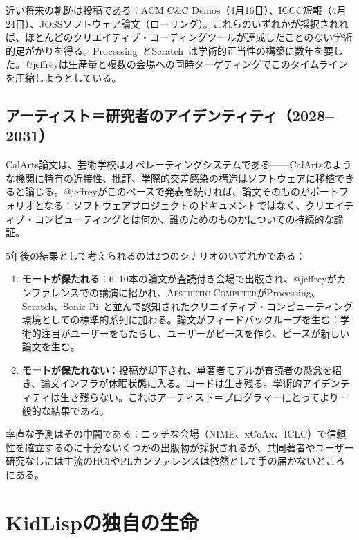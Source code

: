\documentclass[10pt,letterpaper,twocolumn]{article}
\newcommand{\ac}{\textsc{Aesthetic Computer}}
\begin{document}
近い将来の軌跡は投稿である：ACM C\&C Demos（4月16日）、ICCC短報（4月24日）、JOSSソフトウェア論文（ローリング）。これらのいずれかが採択されれば、ほとんどのクリエイティブ・コーディングツールが達成したことのない学術的足がかりを得る。Processing~\citep{reas2007processing}とScratch~\citep{resnick2009scratch}は学術的正当性の構築に数年を要した。@jeffreyは生産量と複数の会場への同時ターゲティングでこのタイムラインを圧縮しようとしている。

\subsection{アーティスト＝研究者のアイデンティティ（2028--2031）}

CalArts論文は、芸術学校はオペレーティングシステムである——CalArtsのような機関に特有の近接性、批評、学際的交差感染の構造はソフトウェアに移植できると論じる。@jeffreyがこのペースで発表を続ければ、論文そのものがポートフォリオとなる：ソフトウェアプロジェクトのドキュメントではなく、クリエイティブ・コンピューティングとは何か、誰のためのものかについての持続的な論証。

5年後の結果として考えられるのは2つのシナリオのいずれかである：

\begin{enumerate}
  \item \textbf{モートが保たれる}：6--10本の論文が査読付き会場で出版され、@jeffreyがカンファレンスでの講演に招かれ、\ac{}がProcessing、Scratch、Sonic Pi~\citep{aaron2016sonic}と並んで認知されたクリエイティブ・コンピューティング環境としての標準的系列に加わる。論文がフィードバックループを生む：学術的注目がユーザーをもたらし、ユーザーがピースを作り、ピースが新しい論文を生む。
  \item \textbf{モートが保たれない}：投稿が却下され、単著者モデルが査読者の懸念を招き、論文インフラが休眠状態に入る。コードは生き残る。学術的アイデンティティは生き残らない。これはアーティスト＝プログラマーにとってより一般的な結果である。
\end{enumerate}

率直な予測はその中間である：ニッチな会場（NIME、xCoAx、ICLC）で信頼性を確立するのに十分ないくつかの出版物が採択されるが、共同著者やユーザー研究なしには主流のHCIやPLカンファレンスは依然として手の届かないところにある。


\section{KidLispの独自の生命}
\label{sec:kidlisp}
\end{document}
